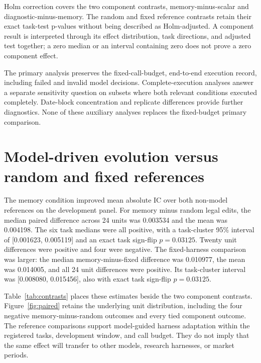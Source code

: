 Holm correction covers the two component contrasts, memory-minus-scalar and diagnostic-minus-memory. The random and fixed reference contrasts retain their exact task-test p-values without being described as Holm-adjusted. A component result is interpreted through its effect distribution, task directions, and adjusted test together; a zero median or an interval containing zero does not prove a zero component effect.

The primary analysis preserves the fixed-call-budget, end-to-end execution record, including failed and invalid model decisions. Complete-execution analyses answer a separate sensitivity question on subsets where both relevant conditions executed completely. Date-block concentration and replicate differences provide further diagnostics. None of these auxiliary analyses replaces the fixed-budget primary comparison.

\section{Model-driven evolution versus random and fixed references}
\label{sec:primary}

The memory condition improved mean absolute IC over both non-model references on the development panel. For memory minus random legal edits, the median paired difference across 24 units was 0.003534 and the mean was 0.004198. The six task medians were all positive, with a task-cluster 95\% interval of [0.001623, 0.005119] and an exact task sign-flip $p=0.03125$. Twenty unit differences were positive and four were negative. The fixed-harness comparison was larger: the median memory-minus-fixed difference was 0.010977, the mean was 0.014005, and all 24 unit differences were positive. Its task-cluster interval was [0.008080, 0.015456], also with exact task sign-flip $p=0.03125$.

Table~\ref{tab:contrasts} places these estimates beside the two component contrasts. Figure~\ref{fig:paired} retains the underlying unit distribution, including the four negative memory-minus-random outcomes and every tied component outcome. The reference comparisons support model-guided harness adaptation within the registered tasks, development window, and call budget. They do not imply that the same effect will transfer to other models, research harnesses, or market periods.

